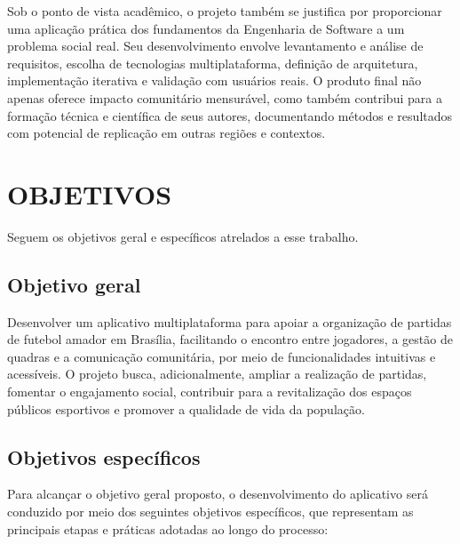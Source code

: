 Sob o ponto de vista acadêmico, o projeto também se justifica por proporcionar uma aplicação prática dos fundamentos da Engenharia de Software a um problema social real. Seu desenvolvimento envolve levantamento e análise de requisitos, escolha de tecnologias multiplataforma, definição de arquitetura, implementação iterativa e validação com usuários reais. O produto final não apenas oferece impacto comunitário mensurável, como também contribui para a formação técnica e científica de seus autores, documentando métodos e resultados com potencial de replicação em outras regiões e contextos.

\section{OBJETIVOS}

Seguem os objetivos geral e específicos atrelados a esse trabalho.

\subsection{Objetivo geral}

Desenvolver um aplicativo multiplataforma para apoiar a organização de partidas de futebol amador em Brasília, facilitando o encontro entre jogadores, a gestão de quadras e a comunicação comunitária, por meio de funcionalidades intuitivas e acessíveis. O projeto busca, adicionalmente, ampliar a realização de partidas, fomentar o engajamento social, contribuir para a revitalização dos espaços públicos esportivos e promover a qualidade de vida da população.

\subsection{Objetivos específicos}

Para alcançar o objetivo geral proposto, o desenvolvimento do aplicativo será conduzido por meio dos seguintes objetivos específicos, que representam as principais etapas e práticas adotadas ao longo do processo:

